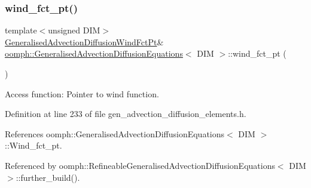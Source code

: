 \mbox{\label{classoomph_1_1GeneralisedAdvectionDiffusionEquations_a03c11fe6f8c2244b831b0a240e6b42ef}} 
\subsubsection{\texorpdfstring{wind\+\_\+fct\+\_\+pt()}{wind\_fct\_pt()}\hspace{0.1cm}{\footnotesize\ttfamily [1/2]}}
{\footnotesize\ttfamily template$<$unsigned D\+IM$>$ \\
\hyperlink{classoomph_1_1GeneralisedAdvectionDiffusionEquations_ac5a63eb03aee5957e7b14a4578423cfc}{Generalised\+Advection\+Diffusion\+Wind\+Fct\+Pt}\& \hyperlink{classoomph_1_1GeneralisedAdvectionDiffusionEquations}{oomph\+::\+Generalised\+Advection\+Diffusion\+Equations}$<$ D\+IM $>$\+::wind\+\_\+fct\+\_\+pt (\begin{DoxyParamCaption}{ }\end{DoxyParamCaption})\hspace{0.3cm}{\ttfamily [inline]}}



Access function\+: Pointer to wind function. 



Definition at line 233 of file gen\+\_\+advection\+\_\+diffusion\+\_\+elements.\+h.



References oomph\+::\+Generalised\+Advection\+Diffusion\+Equations$<$ D\+I\+M $>$\+::\+Wind\+\_\+fct\+\_\+pt.



Referenced by oomph\+::\+Refineable\+Generalised\+Advection\+Diffusion\+Equations$<$ D\+I\+M $>$\+::further\+\_\+build().

\mbox{\label{classoomph_1_1GeneralisedAdvectionDiffusionEquations_a51b286f75d62c1d9b62961555615d560}} 
